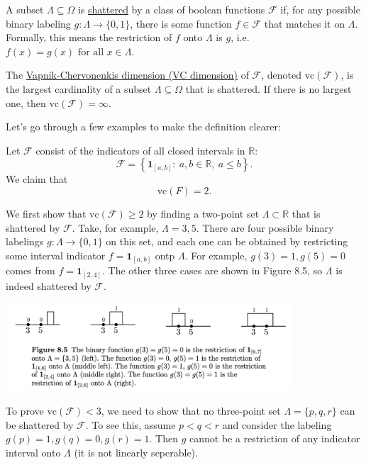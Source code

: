 \begin{definition}[]
\label{def:8.3.1}
A subset $\Lambda \subseteq \Omega$ is \underline{shattered} by a class of boolean functions $\mathcal{F}$ if, 
for any possible binary labeling $g: \Lambda \to \{0, 1\}$, there is some function $f \in \mathcal{F}$ that 
matches it on $\Lambda$. Formally, this means the restriction of $f$ onto $\Lambda$ is $g$, i.e. 
$f(x) = g(x) \text{ for all } x \in \Lambda$.

The \underline{Vapnik-Chervonenkis dimension (VC dimension)} of $\mathcal{F}$, denoted 
$\mathrm{vc}(\mathcal{F})$, is the largest cardinality of a subset $\Lambda \subseteq \Omega$ that is shattered. 
If there is no largest one, then $\mathrm{vc}(\mathcal{F}) = \infty$.
\end{definition}

Let's go through a few examples to make the definition clearer:

\begin{example}[Intervals]
\label{ex:8.3.2}
Let $\mathcal{F}$ consist of the indicators of all closed intervals in $\mathbb{R}$:
\[ \mathcal{F} = \left\{ \mathbf{1}_{[a, b]}: \ a, b \in \mathbb{R}, \ a \leq b \right\}. \]
We claim that 
\[ \mathrm{vc}(F) = 2. \]

We first show that $\mathrm{vc}(\mathcal{F}) \geq 2$ by finding a two-point set $\Lambda \subset \mathbb{R}$ 
that is shattered by $\mathcal{F}$. Take, for example, $\Lambda = 3, 5$. There are four possible binary 
labelings $g: \Lambda \to \{0, 1\}$ on this set, and each one can be obtained by restricting some interval 
indicator $f = \mathbf{1}_{[a, b]}$ ontp $\Lambda$. For example, $g(3) = 1, g(5) = 0$ comes from 
$f = \mathbf{1}_{[2, 4]}$. The other three cases are shown in Figure 8.5, so $\Lambda$ is indeed shattered by 
$\mathcal{F}$.

\begin{center}
    \includegraphics[width=0.8\textwidth]{Chapter 8/fig8-5.png}
\end{center}

To prove $\mathrm{vc}(\mathcal{F}) < 3$, we need to show that no three-point set $\Lambda = \{p, q, r\}$ can 
be shattered by $\mathcal{F}$. To see this, assume $p < q < r$ and consider the labeling $g(p) = 1, g(q) = 0, 
g(r) = 1$. Then $g$ cannot be a restriction of any indicator interval onto $\Lambda$ (it is not linearly 
seperable).
\end{example}

